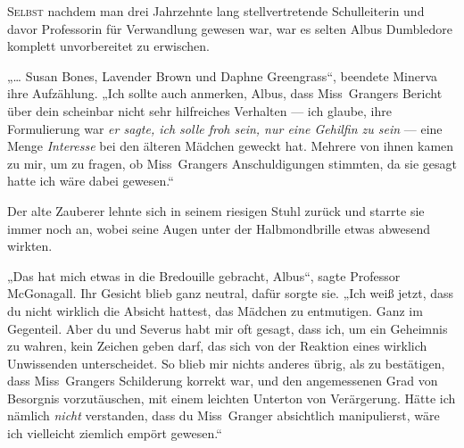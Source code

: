 
\lettrine{S}{elbst} nachdem man drei Jahrzehnte lang stellvertretende Schulleiterin und davor Professorin für Verwandlung gewesen war, war es selten Albus Dumbledore komplett unvorbereitet zu erwischen.

„… Susan Bones, Lavender Brown und Daphne Greengrass“, beendete Minerva ihre Aufzählung.
„Ich sollte auch anmerken, Albus, dass Miss~Grangers Bericht über dein scheinbar nicht sehr hilfreiches Verhalten — ich glaube, ihre Formulierung war \emph{er sagte, ich solle froh sein, nur eine Gehilfin zu sein} — eine Menge \emph{Interesse} bei den älteren Mädchen geweckt hat. Mehrere von ihnen kamen zu mir, um zu fragen, ob Miss~Grangers Anschuldigungen stimmten, da sie gesagt hatte ich wäre dabei gewesen.“

Der alte Zauberer lehnte sich in seinem riesigen Stuhl zurück und starrte sie immer noch an, wobei seine Augen unter der Halbmondbrille etwas abwesend wirkten.

„Das hat mich etwas in die Bredouille gebracht, Albus“, sagte Professor McGonagall. Ihr Gesicht blieb ganz neutral, dafür sorgte sie.
„Ich weiß jetzt, dass du nicht wirklich die Absicht hattest, das Mädchen zu entmutigen. Ganz im Gegenteil. Aber du und Severus habt mir oft gesagt, dass ich, um ein Geheimnis zu wahren, kein Zeichen geben darf, das sich von der Reaktion eines wirklich Unwissenden unterscheidet. So blieb mir nichts anderes übrig, als zu bestätigen, dass Miss~Grangers Schilderung korrekt war, und den angemessenen Grad von Besorgnis vorzutäuschen, mit einem leichten Unterton von Verärgerung. Hätte ich nämlich \emph{nicht} verstanden, dass du Miss~Granger absichtlich manipulierst, wäre ich vielleicht ziemlich empört gewesen.“

